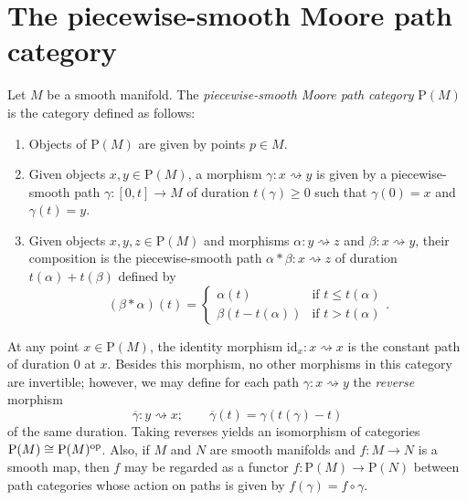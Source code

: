 \section{The piecewise-smooth Moore path category}

\begin{definition}
  Let $M$ be a smooth manifold. The \textit{piecewise-smooth Moore path category} $\mathrm{P}(M)$ is the category defined as follows:
  \begin{enumerate}
    \item Objects of $\mathrm{P}(M)$ are given by points $p \in M$.

    \item Given objects $x, y \in \mathrm{P}(M)$, a morphism $\gamma \colon x \rightsquigarrow y$ is given by a piecewise-smooth path $\gamma \colon [0, t] \to M$ of duration $t(\gamma) \geq 0$ such that $\gamma(0) = x$ and $\gamma(t) = y$. 
    
    \item Given objects $x, y, z \in \mathrm{P}(M)$ and morphisms $\alpha \colon y \rightsquigarrow z$ and $\beta \colon x \rightsquigarrow y$, their composition is the piecewise-smooth path $\alpha \ast \beta \colon x \rightsquigarrow z$ of duration $t(\alpha) + t(\beta)$ defined by 
    \begin{equation}
      (\beta \ast \alpha)(t) = 
      \begin{cases}
        \alpha(t) &\text{if } t \leq t(\alpha) \\
        \beta(t- t(\alpha)) &\text{if } t > t(\alpha)
      \end{cases}.
    \end{equation}
  \end{enumerate}
\end{definition}

At any point $x \in \mathrm{P}(M)$, the identity morphism $\mathrm{id}_x \colon x \rightsquigarrow x$ is the constant path of duration $0$ at $x$. Besides this morphism, no other morphisms in this category are invertible; however, we may define for each path $\gamma \colon x \rightsquigarrow y$ the \textit{reverse} morphism
\begin{equation}
  \overline{\gamma} \colon y \rightsquigarrow x; \quad \quad \overline{\gamma}(t) = \gamma(t(\gamma) - t)
\end{equation}
of the same duration. Taking reverses yields an isomorphism of categories $\mathrm{P}(M) \cong \mathrm{P}(M)^{\rm op}$. Also, if $M$ and $N$ are smooth manifolds and $f \colon M \to N$ is a smooth map, then $f$ may be regarded as a functor $f \colon \mathrm{P}(M) \to \mathrm{P}(N)$ between path categories whose action on paths is given by $f(\gamma) = f \circ \gamma$.

